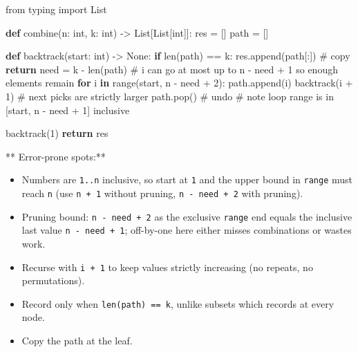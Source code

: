 \documentclass[11pt]{article}
\providecommand{\tightlist}{\setlength{\itemsep}{1pt}\setlength{\parskip}{0pt}}
\newenvironment{Shaded}{\begin{snugshade}}{\end{snugshade}}
\newcommand{\BuiltInTok}[1]{\textcolor[rgb]{0.50,0.55,0.55}{#1}}
\newcommand{\CommentTok}[1]{\textcolor[rgb]{0.48,0.49,0.49}{#1}}
\newcommand{\ControlFlowTok}[1]{\textcolor[rgb]{0.99,0.74,0.29}{\textbf{#1}}}
\newcommand{\DecValTok}[1]{\textcolor[rgb]{0.96,0.45,0.00}{#1}}
\newcommand{\ImportTok}[1]{\textcolor[rgb]{0.15,0.68,0.38}{#1}}
\newcommand{\KeywordTok}[1]{\textcolor[rgb]{0.81,0.81,0.76}{\textbf{#1}}}
\newcommand{\NormalTok}[1]{\textcolor[rgb]{0.81,0.81,0.76}{#1}}
\newcommand{\OperatorTok}[1]{\textcolor[rgb]{0.81,0.81,0.76}{#1}}
\newcommand{\VariableTok}[1]{\textcolor[rgb]{0.15,0.68,0.68}{#1}}
\begin{document}
\begin{Shaded}
\begin{Highlighting}[]
\ImportTok{from}\NormalTok{ typing }\ImportTok{import}\NormalTok{ List}

\KeywordTok{def}\NormalTok{ combine(n: }\BuiltInTok{int}\NormalTok{, k: }\BuiltInTok{int}\NormalTok{) }\OperatorTok{{-}\textgreater{}}\NormalTok{ List[List[}\BuiltInTok{int}\NormalTok{]]:}
\NormalTok{    res }\OperatorTok{=}\NormalTok{ []}
\NormalTok{    path }\OperatorTok{=}\NormalTok{ []}

    \KeywordTok{def}\NormalTok{ backtrack(start: }\BuiltInTok{int}\NormalTok{) }\OperatorTok{{-}\textgreater{}} \VariableTok{None}\NormalTok{:}
        \ControlFlowTok{if} \BuiltInTok{len}\NormalTok{(path) }\OperatorTok{==}\NormalTok{ k:}
\NormalTok{            res.append(path[:])              }\CommentTok{\# copy}
            \ControlFlowTok{return}
\NormalTok{        need }\OperatorTok{=}\NormalTok{ k }\OperatorTok{{-}} \BuiltInTok{len}\NormalTok{(path)}
        \CommentTok{\# i can go at most up to n {-} need + 1 so enough elements remain}
        \ControlFlowTok{for}\NormalTok{ i }\KeywordTok{in} \BuiltInTok{range}\NormalTok{(start, n }\OperatorTok{{-}}\NormalTok{ need }\OperatorTok{+} \DecValTok{2}\NormalTok{):}
\NormalTok{            path.append(i)}
\NormalTok{            backtrack(i }\OperatorTok{+} \DecValTok{1}\NormalTok{)                 }\CommentTok{\# next picks are strictly larger}
\NormalTok{            path.pop()                       }\CommentTok{\# undo}
        \CommentTok{\# note loop range is in [start, n {-} need + 1] inclusive}

\NormalTok{    backtrack(}\DecValTok{1}\NormalTok{)}
    \ControlFlowTok{return}\NormalTok{ res}
\end{Highlighting}
\end{Shaded}

** Error-prone spots:**

\begin{itemize}
\tightlist
\item
  Numbers are \texttt{1..n} inclusive, so start at \texttt{1} and the upper bound in \texttt{range} must reach \texttt{n} (use \texttt{n\ +\ 1} without pruning, \texttt{n\ -\ need\ +\ 2} with pruning).
\item
  Pruning bound: \texttt{n\ -\ need\ +\ 2} as the exclusive \texttt{range} end equals the inclusive last value \texttt{n\ -\ need\ +\ 1}; off-by-one here either misses combinations or wastes work.
\item
  Recurse with \texttt{i\ +\ 1} to keep values strictly increasing (no repeats, no permutations).
\item
  Record only when \texttt{len(path)\ ==\ k}, unlike subsets which records at every node.
\item
  Copy the path at the leaf.
\end{itemize}
\end{document}
